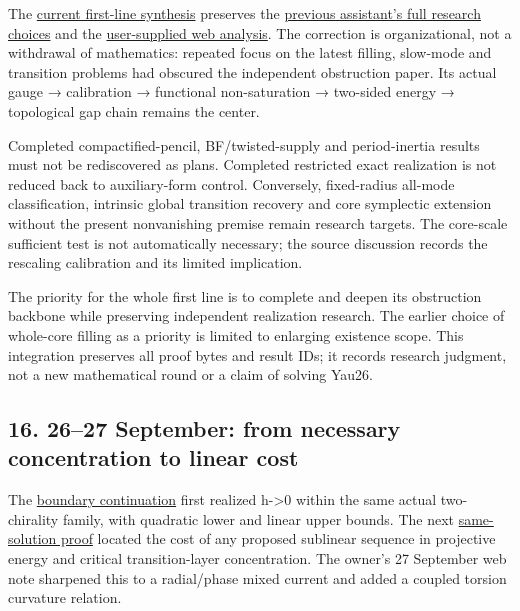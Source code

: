 \documentclass[
  10pt,
]{article}
\begin{document}
The \href{../guidance/LINE1_CURRENT.md}{current first-line synthesis}
preserves the
\href{../guidance/source/20260926_assistant_priorities.zh.md}{previous
assistant's full research choices} and the
\href{../guidance/source/20260926_user_web_backbone.zh.md}{user-supplied
web analysis}. The correction is organizational, not a withdrawal of
mathematics: repeated focus on the latest filling, slow-mode and
transition problems had obscured the independent obstruction paper. Its
actual gauge → calibration → functional non-saturation → two-sided
energy → topological gap chain remains the center.

Completed compactified-pencil, BF/twisted-supply and period-inertia
results must not be rediscovered as plans. Completed restricted exact
realization is not reduced back to auxiliary-form control. Conversely,
fixed-radius all-mode classification, intrinsic global transition
recovery and core symplectic extension without the present nonvanishing
premise remain research targets. The core-scale sufficient test is not
automatically necessary; the source discussion records the rescaling
calibration and its limited implication.

The priority for the whole first line is to complete and deepen its
obstruction backbone while preserving independent realization research.
The earlier choice of whole-core filling as a priority is limited to
enlarging existence scope. This integration preserves all proof bytes
and result IDs; it records research judgment, not a new mathematical
round or a claim of solving Yau26.

\hypertarget{september-from-necessary-concentration-to-linear-cost}{%
\subsection{16. 26--27 September: from necessary concentration to linear
cost}\label{september-from-necessary-concentration-to-linear-cost}}

The \href{../continuation/20260926_boundary_compatibility.md}{boundary
continuation} first realized h-\textgreater0 within the same actual
two-chirality family, with quadratic lower and linear upper bounds. The
next
\href{../continuation/20260926_actual_topological_cost.md}{same-solution
proof} located the cost of any proposed sublinear sequence in projective
energy and critical transition-layer concentration. The owner's 27
September web note sharpened this to a radial/phase mixed current and
added a coupled torsion curvature relation.
\end{document}
